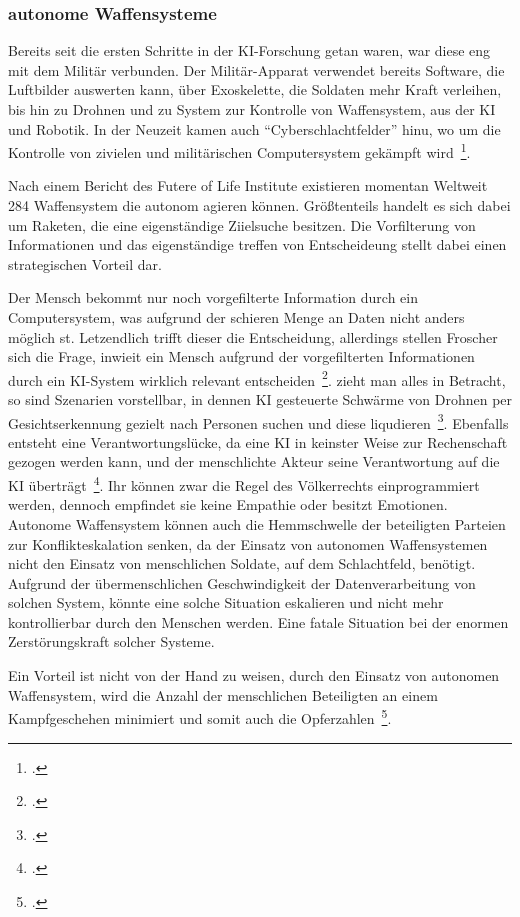 \subsubsection{autonome Waffensysteme}

Bereits seit die ersten Schritte in der \ac{KI}-Forschung getan waren, war diese eng mit dem Militär verbunden. Der Militär-Apparat verwendet bereits Software, die Luftbilder auswerten kann,
über Exoskelette, die Soldaten mehr Kraft verleihen, bis hin zu Drohnen und zu System zur Kontrolle von Waffensystem, aus der \ac{KI} und Robotik.
In der Neuzeit kamen auch \enquote{Cyberschlachtfelder} hinu, wo um die Kontrolle von zivielen und militärischen Computersystem gekämpft wird~\footcite[\vglf][]{Lenzen.2020}.

Nach einem Bericht des Futere of Life Institute existieren momentan Weltweit 284 Waffensystem die autonom agieren können. Größtenteils handelt es sich dabei um Raketen,
die eine eigenständige Ziielsuche besitzen. Die Vorfilterung von Informationen und das eigenständige treffen von Entscheideung stellt dabei einen strategischen Vorteil dar. 

Der Mensch bekommt nur noch vorgefilterte Information durch ein Computersystem, was aufgrund der schieren Menge an Daten nicht anders möglich st. Letzendlich trifft dieser
die Entscheidung, allerdings stellen Froscher sich die Frage, inwieit ein Mensch aufgrund der vorgefilterten Informationen durch ein \ac{KI}-System wirklich relevant entscheiden~\footcite[\vglf][]{Lenzen.2020}.
zieht man alles in Betracht, so sind Szenarien vorstellbar, in dennen \ac{KI} gesteuerte Schwärme von Drohnen per Gesichtserkennung gezielt nach Personen suchen und diese liqudieren~\footcite[\vglf][]{Kipper.2020}.
Ebenfalls entsteht eine Verantwortungslücke, da eine \ac{KI} in keinster Weise zur Rechenschaft gezogen werden kann, und der menschlichte Akteur seine Verantwortung auf die 
\ac{KI} überträgt~\footcite[\vglf][]{Heinrichs.2022}.
Ihr können zwar die Regel des Völkerrechts einprogrammiert werden, dennoch empfindet sie keine Empathie oder besitzt Emotionen.
Autonome Waffensystem können auch die Hemmschwelle der beteiligten Parteien zur Konflikteskalation senken, da der Einsatz von autonomen Waffensystemen nicht den Einsatz 
von menschlichen Soldate, auf dem Schlachtfeld, benötigt.
Aufgrund der übermenschlichen Geschwindigkeit der Datenverarbeitung von solchen System, könnte eine solche Situation eskalieren und nicht mehr kontrollierbar durch den Menschen werden.
Eine fatale Situation bei der enormen Zerstörungskraft solcher Systeme.

Ein Vorteil ist nicht von der Hand zu weisen, durch den Einsatz von autonomen Waffensystem, wird die Anzahl der menschlichen Beteiligten an einem Kampfgeschehen minimiert und 
somit auch die Opferzahlen~\footcite[\vglf][]{Kipper.2020}.